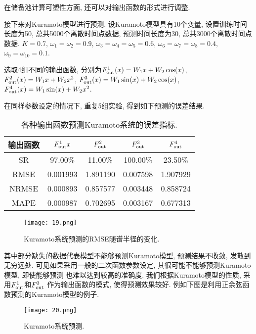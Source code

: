 \documentclass[notitlepage,cs4size,punct,oneside]{ctexrep}
\numberwithin{equation}{chapter}
\theoremstyle{mystyle}
\begin{document}
在储备池计算可塑性方面, 还可以对输出函数的形式进行调整. 

接下来对Kuramoto模型进行预测, 设Kuramoto模型具有10个变量, 
设置训练时间长度为50, 总共5000个离散时间点数据, 
预测时间长度为30, 总共3000个离散时间点数据. 
$K=0.7$, $\omega_1=\omega_2=0.9$, $\omega_3=\omega_4=\omega_5=0.6$, 
$\omega_6=\omega_7=\omega_8=0.4$, $\omega_9=\omega_{10}=0.1$.  

选取4组不同的输出函数, 分别为$F_{\textmd{out}}^1(x)=W_1x+W_2\cos(x)$, 
$F_{\textmd{out}}^2(x)=W_1x+W_2x^2$, 
$F_{\textmd{out}}^3(x)=W_1\sin(x)+W_2\cos(x)$, 
$F_{\textmd{out}}^4(x)=W_1\sin(x)+W_2x^2$. 

在同样参数设定的情况下, 重复5组实验, 得到如下预测的误差结果. 
\noindent\begin{table}[htbp]\centering
    \caption{各种输出函数预测Kuramoto系统的误差指标.}
    \begin{tabular}{ccccc}
    \hline\hline
    输出函数 & $F_{\textmd{out}}^1x$ & $F_{\textmd{out}}^2$ & $F_{\textmd{out}}^3$ & $F_{\textmd{out}}^4$ \\
    \hline
    SR   & 97.00\% & 11.00\% & 100.00\% & 23.50\% \\
    RMSE   & 0.001993 & 1.891190 & 0.007598 & 1.907929 \\
    NRMSE   & 0.000893 & 0.857577 & 0.003448 & 0.858724 \\
    MAPE   & 0.000987 & 0.702695 & 0.003167 & 0.677313 \\
    \hline\hline
    \end{tabular}
\end{table}

\begin{figure}[htbp]
    \centering
    \texttt{[image: 19.png]}
    \caption{Kuramoto系统预测的RMSE随谱半径的变化.}
\end{figure}

其中部分缺失的数据代表模型不能够预测Kuramoto模型, 预测结果不收敛, 发散到无穷远处. 
可见如果采用一般的二次函数参数设定, 其很可能不能够预测Kuramoto模型, 即使能够预测
也难以达到较高的准确度. 我们根据Kuramoto模型的性质, 采用$F_{\textmd{out}}^1$和$F_{\textmd{out}}^3$
作为输出函数的模式, 
使得预测效果较好. 例如下图是利用正余弦函数预测的Kuramoto模型的例子. 
\begin{figure}[htbp]
    \centering
    \texttt{[image: 20.png]}
    \caption{Kuramoto系统预测.}
\end{figure}


\end{document}
